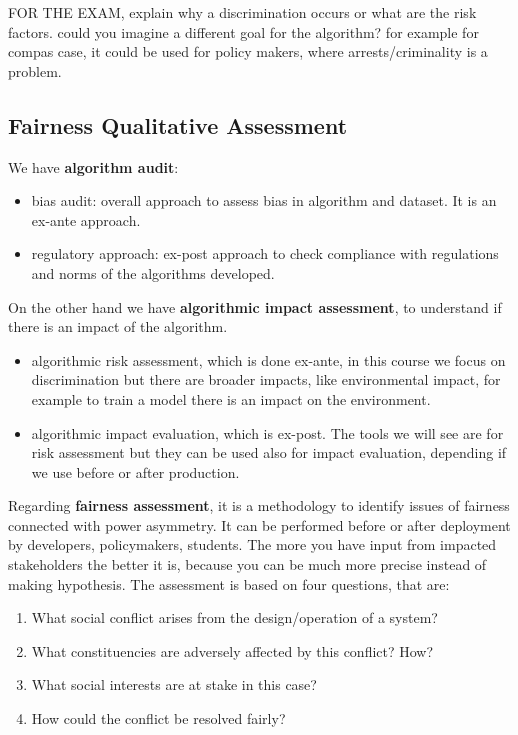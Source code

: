 FOR THE EXAM, explain why a discrimination occurs or what are the risk factors. could you imagine a different goal for the algorithm? for example for compas case, it could be used for policy makers, where arrests/criminality is a problem.

\subsection{Fairness Qualitative Assessment}
We have \textbf{algorithm audit}:
\begin{itemize}
    \item bias audit: overall approach to assess bias in algorithm and dataset. It is an ex-ante approach.
    \item regulatory approach: ex-post approach to check compliance with regulations and norms of the algorithms developed.
\end{itemize}
On the other hand we have \textbf{algorithmic impact assessment}, to understand if there is an impact of the algorithm. 
\begin{itemize}
    \item algorithmic risk assessment, which is done ex-ante, in this course we focus on discrimination but there are broader impacts, like environmental impact, for example to train a model there is an impact on the environment.
    \item algorithmic impact evaluation, which is ex-post. The tools we will see are for risk assessment but they can be used also for impact evaluation, depending if we use before or after production.
\end{itemize}
Regarding \textbf{fairness assessment}, it is a methodology to identify issues of fairness connected with power asymmetry. It can be performed before or after deployment by developers, policymakers, students. The more you have input from impacted stakeholders the better it is, because you can be much more precise instead of making hypothesis. 
The assessment is based on four questions, that are:
\begin{enumerate}
    \item What social conflict arises from the design/operation of a system? 
    \item What constituencies are adversely affected by this conflict? How?
    \item What social interests are at stake in this case?
    \item How could the conflict be resolved fairly?
\end{enumerate}
